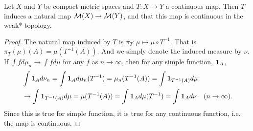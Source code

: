 \documentclass[12pt,a4paper]{article}
\begin{document}
	\begin{proposition}{}{}
		Let $X$ and $Y$ be compact metric spaces and $T:X\to Y$ a continuous map. Then $T$ induces a natural map $\mathcal{M}(X)\to \mathcal{M}(Y)$, and that this map is continuous in the weak* topology.
	\end{proposition}
	\begin{proof}
		The natural map induced by $T$ is $\pi_T: \mu\mapsto \mu\circ T^{-1}$. That is $\pi_T(\mu)(A)=\mu(T^{-1}(A))$. And we simply denote the induced measure by $\nu$. If $\int f d\mu_n\to\int f d\mu$ for any $f$ as $n\to\infty$, then for any simple function, $\mathbf{1}_A$,
		\begin{align*}
			&\int \mathbf{1}_A d\nu_n=\int \mathbf{1}_A d\mu_n(T^{-1})=\mu_n(T^{-1}(A))=\int \mathbf{1}_{T^{-1}(A)}d\mu\\
			&\to \int \mathbf{1}_{T^{-1}(A)}d\mu=\mu(T^{-1}(A))=\int \mathbf{1}_A d\mu(T^{-1})=\int \mathbf{1}_A d\nu\quad (n\to\infty).
		\end{align*}
		Since this is true for simple function, it is true for any continuous function, i.e. the map is continuous.
	\end{proof}









	
	
\end{document}
